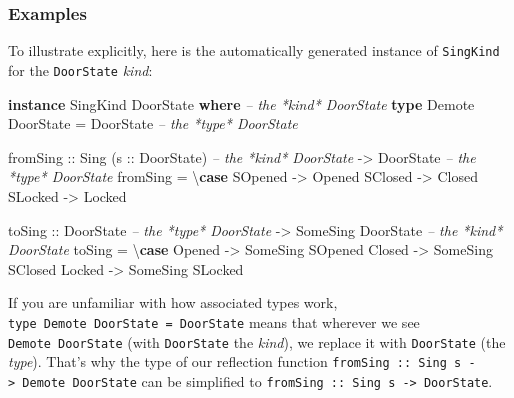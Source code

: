 \documentclass[]{article}
\newenvironment{Shaded}{}{}
\newcommand{\CommentTok}[1]{\textcolor[rgb]{0.38,0.63,0.69}{\textit{#1}}}
\newcommand{\DataTypeTok}[1]{\textcolor[rgb]{0.56,0.13,0.00}{#1}}
\newcommand{\FunctionTok}[1]{\textcolor[rgb]{0.02,0.16,0.49}{#1}}
\newcommand{\KeywordTok}[1]{\textcolor[rgb]{0.00,0.44,0.13}{\textbf{#1}}}
\newcommand{\NormalTok}[1]{#1}
\newcommand{\OtherTok}[1]{\textcolor[rgb]{0.00,0.44,0.13}{#1}}
\begin{document}
\hypertarget{examples}{%
\subsubsection{Examples}\label{examples}}

To illustrate explicitly, here is the automatically generated instance of
\texttt{SingKind} for the \texttt{DoorState} \emph{kind}:

\begin{Shaded}
\begin{Highlighting}[]
\KeywordTok{instance} \DataTypeTok{SingKind} \DataTypeTok{DoorState} \KeywordTok{where}       \CommentTok{-- the *kind* DoorState}
    \KeywordTok{type} \DataTypeTok{Demote} \DataTypeTok{DoorState} \FunctionTok{=} \DataTypeTok{DoorState}   \CommentTok{-- the *type* DoorState}

\NormalTok{    fromSing}
\OtherTok{        ::} \DataTypeTok{Sing}\NormalTok{ (}\OtherTok{s ::} \DataTypeTok{DoorState}\NormalTok{)        }\CommentTok{-- the *kind* DoorState}
        \OtherTok{->} \DataTypeTok{DoorState}                    \CommentTok{-- the *type* DoorState}
\NormalTok{    fromSing }\FunctionTok{=}\NormalTok{ \textbackslash{}}\KeywordTok{case}
        \DataTypeTok{SOpened} \OtherTok{->} \DataTypeTok{Opened}
        \DataTypeTok{SClosed} \OtherTok{->} \DataTypeTok{Closed}
        \DataTypeTok{SLocked} \OtherTok{->} \DataTypeTok{Locked}

\NormalTok{    toSing}
\OtherTok{        ::} \DataTypeTok{DoorState}                    \CommentTok{-- the *type* DoorState}
        \OtherTok{->} \DataTypeTok{SomeSing} \DataTypeTok{DoorState}           \CommentTok{-- the *kind* DoorState}
\NormalTok{    toSing }\FunctionTok{=}\NormalTok{ \textbackslash{}}\KeywordTok{case}
        \DataTypeTok{Opened} \OtherTok{->} \DataTypeTok{SomeSing} \DataTypeTok{SOpened}
        \DataTypeTok{Closed} \OtherTok{->} \DataTypeTok{SomeSing} \DataTypeTok{SClosed}
        \DataTypeTok{Locked} \OtherTok{->} \DataTypeTok{SomeSing} \DataTypeTok{SLocked}
\end{Highlighting}
\end{Shaded}

If you are unfamiliar with how associated types work,
\texttt{type\ Demote\ DoorState\ =\ DoorState} means that wherever we see
\texttt{Demote\ DoorState} (with \texttt{DoorState} the \emph{kind}), we replace
it with \texttt{DoorState} (the \emph{type}). That's why the type of our
reflection function
\texttt{fromSing\ ::\ Sing\ s\ -\textgreater{}\ Demote\ DoorState} can be
simplified to \texttt{fromSing\ ::\ Sing\ s\ -\textgreater{}\ DoorState}.
\end{document}
